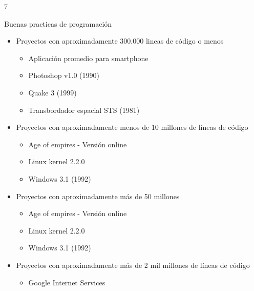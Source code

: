 7\documentclass[xcolor=pdftex,table,11pt]{beamer}
\begin{document}
\begin{frame}{Buenas practicas de programación}
\begin{itemize}

\item<1-> Proyectos con aproximadamente 300.000 lineas de código o menos
\begin{itemize}
\item<1->  Aplicación promedio para smartphone
\item<2->  Photoshop v1.0 (1990)
\item<3->  Quake 3 (1999)
\item<4->  Transbordador espacial STS (1981)
\end{itemize}

\item<5-> Proyectos con aproximadamente menos de 10 millones de líneas de código
\begin{itemize}
\item<6->  Age of empires - Versión online
\item<7->  Linux kernel 2.2.0
\item<8->  Windows 3.1 (1992)
\end{itemize}


\item<9-> Proyectos con aproximadamente más de 50 millones
\begin{itemize}
\item<10->  Age of empires - Versión online
\item<11->  Linux kernel 2.2.0
\item<12->  Windows 3.1 (1992)
\end{itemize}



\item<13-> Proyectos con aproximadamente más de 2 mil millones de líneas de código
\begin{itemize}
\item<14->  Google Internet Services
\end{itemize}


\end{itemize}



\end{frame}
\end{document}
